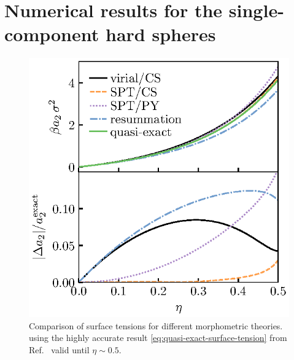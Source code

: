 \documentclass[11pt,twoside]{report}
\begin{document}

\section{Numerical results for the single-component hard spheres}

\begin{figure}
  \includegraphics[width=0.9\linewidth,outer]{resummation-a2}
  \caption[Accuracy of surface tension obtained from partially resumming the virial series]{
    Comparison of surface tensions for different morphometric theories.
  using the highly accurate result \eqref{eq:quasi-exact-surface-tension} from Ref.\ \cite{DavidchackMP2015} valid until $\eta \sim 0.5$.}
  \label{fig:resummation-a2}
\end{figure}
\end{document}
